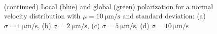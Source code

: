 \documentclass[../../master_thesis_np.tex]{subfiles}
\begin{document}
		\begin{figure}
			\centering
			\ContinuedFloat
			\\
			
			\caption{(continued) Local (blue) and global (green) polarization for a normal velocity distribution with $\mu = \SI{10}{\um\per\second}$ and standard deviation: (a) $\sigma = \SI{1}{\um\per\second}$, (b) $\sigma = \SI{2}{\um\per\second}$, (c) $\sigma = \SI{5}{\um\per\second}$, (d) $\sigma = \SI{10}{\um\per\second}$}
			\label{fig:lj_vdist_pol}
		\end{figure}
		
\end{document}
